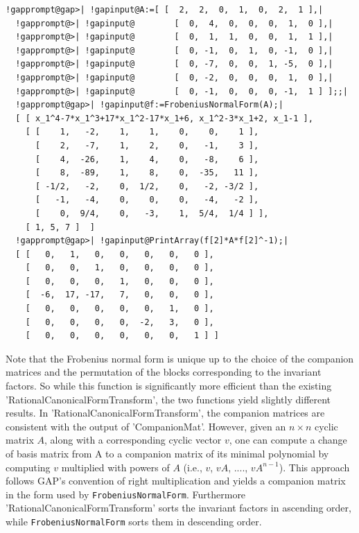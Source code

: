 \documentclass[a4paper,11pt]{report}
\begin{document}
{{{ 
\begin{Verbatim}[commandchars=!@|,fontsize=\small,frame=single,label=Example]
  !gapprompt@gap>| !gapinput@A:=[ [  2,  2,  0,  1,  0,  2,  1 ],|
  !gapprompt@>| !gapinput@        [  0,  4,  0,  0,  0,  1,  0 ],|
  !gapprompt@>| !gapinput@        [  0,  1,  1,  0,  0,  1,  1 ],|
  !gapprompt@>| !gapinput@        [  0, -1,  0,  1,  0, -1,  0 ],|
  !gapprompt@>| !gapinput@        [  0, -7,  0,  0,  1, -5,  0 ],|
  !gapprompt@>| !gapinput@        [  0, -2,  0,  0,  0,  1,  0 ],|
  !gapprompt@>| !gapinput@        [  0, -1,  0,  0,  0, -1,  1 ] ];;|
  !gapprompt@gap>| !gapinput@f:=FrobeniusNormalForm(A);|
  [ [ x_1^4-7*x_1^3+17*x_1^2-17*x_1+6, x_1^2-3*x_1+2, x_1-1 ], 
    [ [    1,   -2,    1,    1,    0,    0,    1 ],
      [    2,   -7,    1,    2,    0,   -1,    3 ],
      [    4,  -26,    1,    4,    0,   -8,    6 ],
      [    8,  -89,    1,    8,    0,  -35,   11 ],
      [ -1/2,   -2,    0,  1/2,    0,   -2, -3/2 ],
      [   -1,   -4,    0,    0,    0,   -4,   -2 ],
      [    0,  9/4,    0,   -3,    1,  5/4,  1/4 ] ],
    [ 1, 5, 7 ]  ]                 
  !gapprompt@gap>| !gapinput@PrintArray(f[2]*A*f[2]^-1);|
  [ [   0,   1,   0,   0,   0,   0,   0 ], 
    [   0,   0,   1,   0,   0,   0,   0 ],
    [   0,   0,   0,   1,   0,   0,   0 ],
    [  -6,  17, -17,   7,   0,   0,   0 ],
    [   0,   0,   0,   0,   0,   1,   0 ],
    [   0,   0,   0,   0,  -2,   3,   0 ],
    [   0,   0,   0,   0,   0,   0,   1 ] ]
\end{Verbatim}
 Note that the Frobenius normal form is unique up to the choice of the
companion matrices and the permutation of the blocks corresponding to the
invariant factors. So while this function is significantly more efficient than
the existing 'RationalCanonicalFormTransform', the two functions yield
slightly different results. In 'RationalCanonicalFormTransform', the companion
matrices are consistent with the output of 'CompanionMat'. However, given an $n\times n$ cyclic matrix $A$, along with a corresponding cyclic vector $v$, one can compute a change of basis matrix from A to a companion matrix of its
minimal polynomial by computing $v$ multiplied with powers of $A$ (i.e., $v$, $vA$, ...., $vA^{n-1}$). This approach follows GAP{\textquoteright}s convention of right
multiplication and yields a companion matrix in the form used by \texttt{FrobeniusNormalForm}. Furthermore 'RationalCanonicalFormTransform' sorts the invariant factors in
ascending order, while \texttt{FrobeniusNormalForm} sorts them in descending order. 
\begin{Verbatim}[commandchars=!@|,fontsize=\small,frame=single,label=Example]

\end{Verbatim}}}}
\end{document}

